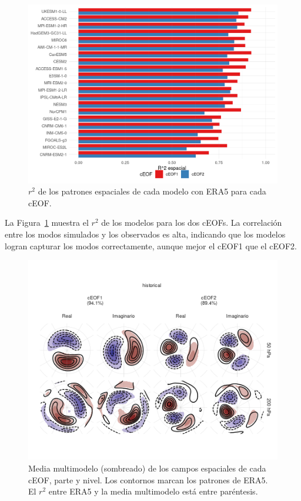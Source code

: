 \documentclass[12pt,oneside]{reedthesis}
\begin{document}
\begin{figure}
\includegraphics{figures/50-cmip6/comparacion-r2-1} \caption{\(r^2\) de los patrones espaciales de cada modelo con ERA5 para cada cEOF.}\label{fig:comparacion-r2}
\end{figure}

La Figura~\ref{fig:comparacion-r2} muestra el \(r^2\) de los modelos para los dos cEOFs.
La correlación entre los modos simulados y los observados es alta, indicando que los modelos logran capturar los modos correctamente, aunque mejor el cEOF1 que el cEOF2.


\begin{figure}
\includegraphics{figures/50-cmip6/mmm-1} \caption{Media multimodelo (sombreado) de los campos espaciales de cada cEOF, parte y nivel. Los contornos marcan los patrones de ERA5. El \(r^2\) entre ERA5 y la media multimodelo está entre paréntesis.}\label{fig:mmm}
\end{figure}
\end{document}
